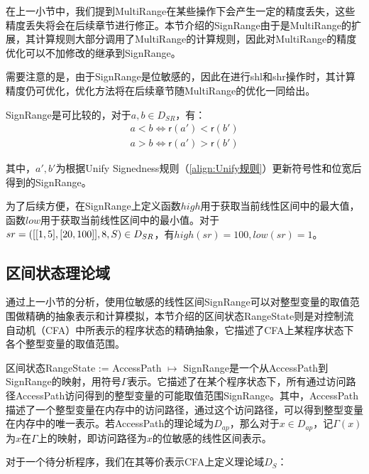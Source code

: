 在上一小节中，我们提到MultiRange在某些操作下会产生一定的精度丢失，这些精度丢失将会在后续章节进行修正。本节介绍的SignRange由于是MultiRange的扩展，其计算规则大部分调用了MultiRange的计算规则，因此对MultiRange的精度优化可以不加修改的继承到SignRange。

需要注意的是，由于SignRange是位敏感的，因此在进行shl和shr操作时，其计算精度仍可优化，优化方法将在后续章节随MultiRange的优化一同给出。

SignRange是可比较的，对于$ a, b \in D_{SR} $，有：\begin{align}
	a < b \iff \mathsf{r}(a') < \mathsf{r}(b')\\
	a > b \iff \mathsf{r}(a') > \mathsf{r}(b')
\end{align}

其中，$ a', b' $为根据Unify Signedness规则（\ref{align:Unify规则}）更新符号性和位宽后得到的SignRange。

为了后续方便，在SignRange上定义函数$ high $用于获取当前线性区间中的最大值，函数$ low $用于获取当前线性区间中的最小值。对于$ sr = ([[1, 5], [20, 100]],8,\\ S) \in D_{SR} $，有$ high(sr) = 100, low(sr) = 1 $。

\subsection{区间状态理论域}
\label{sec:RangeState}

通过上一小节的分析，使用位敏感的线性区间SignRange可以对整型变量的取值范围做精确的抽象表示和计算模拟，本节介绍的区间状态RangeState则是对控制流自动机（CFA）中所表示的程序状态的精确抽象，它描述了CFA上某程序状态下各个整型变量的取值范围。

区间状态RangeState := AccessPath $ \mapsto $ SignRange是一个从AccessPath到SignRange的映射，用符号$ \Gamma $表示。它描述了在某个程序状态下，所有通过访问路径AccessPath访问得到的整型变量的可能取值范围SignRange。其中，AccessPath描述了一个整型变量在内存中的访问路径，通过这个访问路径，可以得到整型变量在内存中的唯一表示。若AccessPath的理论域为$ D_{ap} $，那么对于$ x \in D_{ap}$，记$ \Gamma(x) $为$ x $在$ \Gamma $上的映射，即访问路径为$ x $的位敏感的线性区间表示。

对于一个待分析程序，我们在其等价表示CFA上定义理论域$ D_{S} $：

